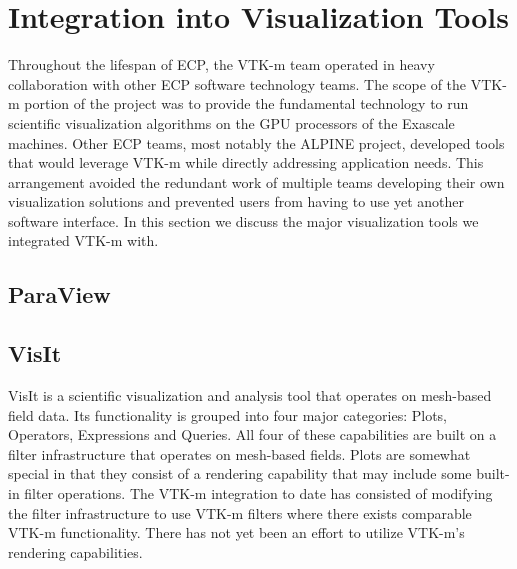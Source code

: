 \section{Integration into Visualization Tools}

Throughout the lifespan of ECP, the VTK-m team operated in heavy collaboration with other ECP software technology teams.
The scope of the VTK-m portion of the project was to provide the fundamental technology to run scientific visualization algorithms on the GPU processors of the Exascale machines.
Other ECP teams, most notably the ALPINE project, developed tools that would leverage VTK-m while directly addressing application needs.
This arrangement avoided the redundant work of multiple teams developing their own visualization solutions and prevented users from having to use yet another software interface.
In this section we discuss the major visualization tools we integrated VTK-m with.


\subsection{ParaView}


\subsection{VisIt}

VisIt is a scientific visualization and analysis tool that operates on mesh-based field data. Its functionality is grouped into four major categories: Plots, Operators, Expressions and Queries. All four of these capabilities are built on a filter infrastructure that operates on mesh-based fields. Plots are somewhat special in that they consist of a rendering capability that may include some built-in filter operations. The VTK-m integration to date has consisted of modifying the filter infrastructure to use VTK-m filters where there exists comparable VTK-m functionality. There has not yet been an effort to utilize VTK-m’s rendering capabilities.


